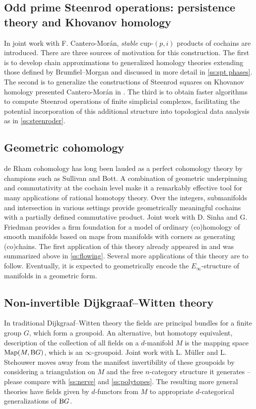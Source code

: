 \subsection{Odd prime Steenrod operations: persistence theory and Khovanov homology} \label{ss:odd prime steenrod operations}

In joint work with F. Cantero-Mor\'an, \emph{stable} cup-$(p,i)$ products of cochains are introduced.
There are three sources of motivation for this construction.
The first is to develop chain approximations to generalized homology theories extending those defined by Brumfiel--Morgan and discussed in more detail in \cref{ss:spt phases}.
The second is to generalize the constructions of Steenrod squares on Khovanov homology presented Cantero-Mor\'an in \cite{cantero-moran2020khovanov}.
The third is to obtain faster algorithms to compute Steenrod operations of finite simplicial complexes, facilitating the potential incorporation of this additional structure into topological data analysis as in \cref{ss:steenroder}.


\subsection{Geometric cohomology} \label{ss:geometric cohomology}

de Rham cohomology has long been lauded as a perfect cohomology theory by champions such as Sullivan and Bott.
A combination of geometric underpinning and commutativity at the cochain level make it a remarkably effective tool for many applications of rational homotopy theory.
Over the integers, submanifolds and intersection in various settings provide geometrically meaningful cochains with a partially defined commutative product.
Joint work with D. Sinha and G. Friedman provides a firm foundation for a model of ordinary (co)homology of smooth manifolds based on maps from manifolds with corners as generating (co)chains.
The first application of this theory already appeared in \cite{medina2021flowing} and was summarized above in \cref{ss:flowing}.
Several more applications of this theory are to follow.
Eventually, it is expected to geometrically encode the $E_\infty$-structure of manifolds in a geometric form.

\subsection{Non-invertible Dijkgraaf--Witten theory}

In traditional Dijkgraaf--Witten theory the fields are principal bundles for a finite
group $G$, which form a groupoid.
An alternative, but homotopy equivalent, description of the collection of all fields on a $d$-manifold $M$ is the mapping space $\mathrm{Map}(M, \mathrm{B} G)$, which is an $\infty$-groupoid.
Joint work with L. M\"uller and L. Stehouwer moves away from the manifest invertibility of these groupoids by considering a triangulation on $M$ and the free $n$-category structure it generates -- please compare with \cref{ss:nerve} and \cref{ss:polytopes}.
The resulting more general theories have fields given by $d$-functors from $M$ to appropriate $d$-categorical generalizations of $\mathrm{B} G$.